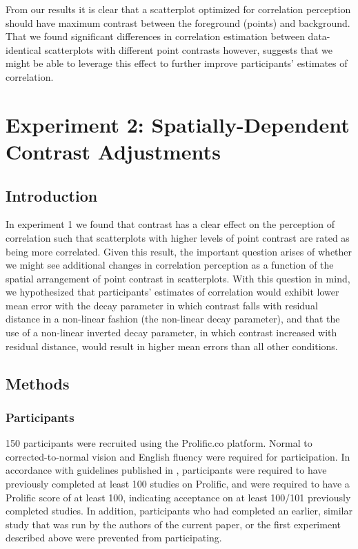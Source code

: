 \documentclass[preprint, 3p,
authoryear]{elsarticle} %
\begin{document}
From our results it is clear that a scatterplot optimized for
correlation perception should have maximum contrast between the
foreground (points) and background. That we found significant
differences in correlation estimation between data-identical
scatterplots with different point contrasts however, suggests that we
might be able to leverage this effect to further improve participants'
estimates of correlation.

\hypertarget{experiment-2-spatially-dependent-contrast-adjustments}{%
\section{Experiment 2: Spatially-Dependent Contrast
Adjustments}\label{experiment-2-spatially-dependent-contrast-adjustments}}

\hypertarget{introduction-2}{%
\subsection{Introduction}\label{introduction-2}}

In experiment 1 we found that contrast has a clear effect on the
perception of correlation such that scatterplots with higher levels of
point contrast are rated as being more correlated. Given this result,
the important question arises of whether we might see additional changes
in correlation perception as a function of the spatial arrangement of
point contrast in scatterplots. With this question in mind, we
hypothesized that participants' estimates of correlation would exhibit
lower mean error with the decay parameter in which contrast falls with
residual distance in a non-linear fashion (the non-linear decay
parameter), and that the use of a non-linear inverted decay parameter,
in which contrast increased with residual distance, would result in
higher mean errors than all other conditions.

\hypertarget{methods}{%
\subsection{Methods}\label{methods}}

\hypertarget{participants-1}{%
\subsubsection{Participants}\label{participants-1}}

150 participants were recruited using the Prolific.co platform. Normal
to corrected-to-normal vision and English fluency were required for
participation. In accordance with guidelines published in
\citep{peer_2021}, participants were required to have previously
completed at least 100 studies on Prolific, and were required to have a
Prolific score of at least 100, indicating acceptance on at least
100/101 previously completed studies. In addition, participants who had
completed an earlier, similar study that was run by the authors of the
current paper, or the first experiment described above were prevented
from participating.
\end{document}
